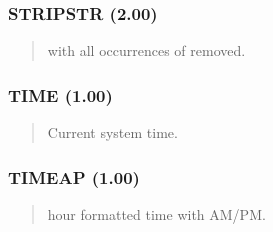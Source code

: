 \documentclass[letterpaper,10pt,english]{sphinxmanual}
\begin{document}
\subsubsection{STRIPSTR (2.00)}
\label{\detokenize{ppl:stripstr-2-00}}\begin{quote}

\sphinxAtStartPar
{}
\begin{description}
\sphinxAtStartPar
{} with all occurrences of  removed.

\end{description}
\end{quote}


\subsubsection{TIME (1.00)}
\label{\detokenize{ppl:time-1-00}}\begin{quote}

\sphinxAtStartPar
{}
\begin{description}
\sphinxAtStartPar
Current system time.

\end{description}
\end{quote}


\subsubsection{TIMEAP (1.00)}
\label{\detokenize{ppl:timeap-1-00}}\begin{quote}

\sphinxAtStartPar
{}
\begin{description}
\sphinxhyphen{}hour formatted time with AM/PM.

\end{description}
\end{quote}
\end{document}
